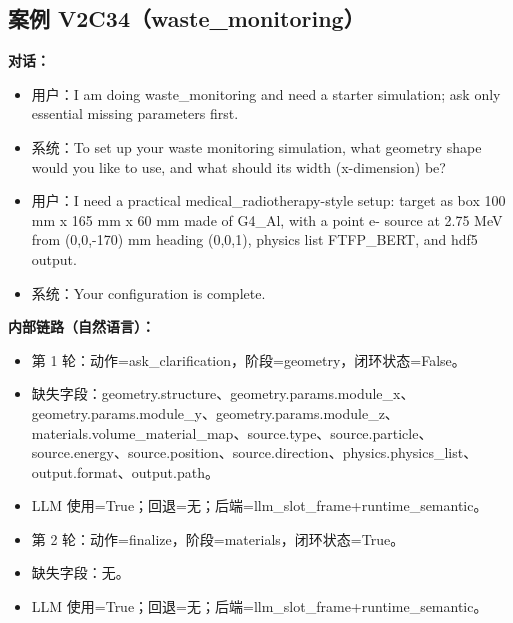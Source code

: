 \documentclass[11pt]{ctexart}
\begin{document}
\subsection{案例 V2C34（waste\_monitoring）}
\textbf{对话：}
\begin{itemize}
\item 用户：I am doing waste\_monitoring and need a starter simulation; ask only essential missing parameters first.
\item 系统：To set up your waste monitoring simulation, what geometry shape would you like to use, and what should its width (x-dimension) be?
\item 用户：I need a practical medical\_radiotherapy-style setup: target as box 100 mm x 165 mm x 60 mm made of G4\_Al, with a point e- source at 2.75 MeV from (0,0,-170) mm heading (0,0,1), physics list FTFP\_BERT, and hdf5 output.
\item 系统：Your configuration is complete.
\end{itemize}
\textbf{内部链路（自然语言）：}
\begin{itemize}
\item 第 1 轮：动作=ask\_clarification，阶段=geometry，闭环状态=False。
\item 缺失字段：geometry.structure、geometry.params.module\_x、geometry.params.module\_y、geometry.params.module\_z、materials.volume\_material\_map、source.type、source.particle、source.energy、source.position、source.direction、physics.physics\_list、output.format、output.path。
\item LLM 使用=True；回退=无；后端=llm\_slot\_frame+runtime\_semantic。
\item 第 2 轮：动作=finalize，阶段=materials，闭环状态=True。
\item 缺失字段：无。
\item LLM 使用=True；回退=无；后端=llm\_slot\_frame+runtime\_semantic。
\end{itemize}
\end{document}
